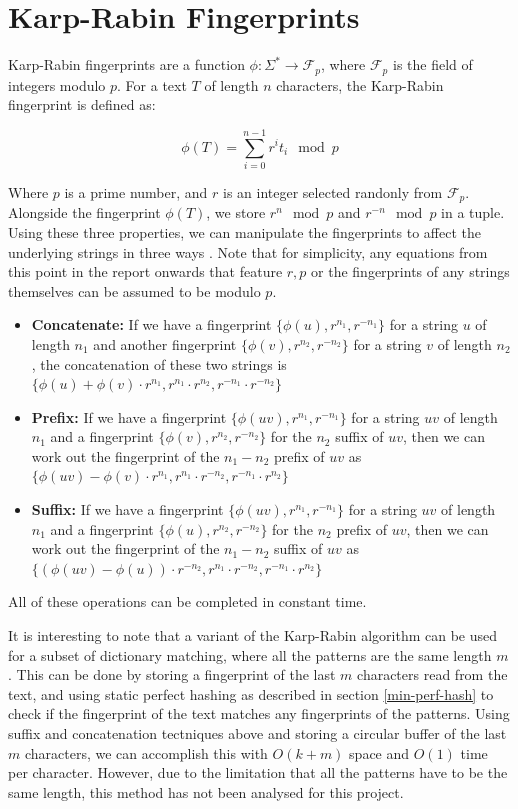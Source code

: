 \documentclass[ %
                    author={Dominic Joseph Moylett},
                    degree={MEng},
                     title={Dictionary Matching with Fingerprints},
                  subtitle={An Empirical Analysis},
                      type={research},
                      year={2015} ]{dissertation}
\begin{document}
\section{Karp-Rabin Fingerprints}
\label{sec:kr-fingerprints}

Karp-Rabin fingerprints \cite{5390135} are a function $\phi : \Sigma^* \to \mathcal{F}_p$, where $\mathcal{F}_p$ is the field of integers modulo $p$. For a text $T$ of length $n$ characters, the Karp-Rabin fingerprint is defined as:

$$\phi(T) = \sum_{i = 0}^{n - 1} r^it_i \mod p$$

Where $p$ is a prime number, and $r$ is an integer selected randonly from $\mathcal{F}_p$. Alongside the fingerprint $\phi(T)$, we store $r^n \mod p$ and $r^{-n} \mod p$ in a tuple. Using these three properties, we can manipulate the fingerprints to affect the underlying strings in three ways \cite{5438620}. Note that for simplicity, any equations from this point in the report onwards that feature $r, p$ or the fingerprints of any strings themselves can be assumed to be modulo $p$.

\begin{itemize}
  \item \textbf{Concatenate:} If we have a fingerprint $\{\phi(u), r^{n_1}, r^{-n_1}\}$ for a string $u$ of length $n_1$ and another fingerprint $\{\phi(v), r^{n_2}, r^{-n_2}\}$ for a string $v$ of length $n_2$, the concatenation of these two strings is $\{\phi(u) + \phi(v)\cdot r^{n_1}, r^{n_1} \cdot r^{n_2}, r^{-n_1} \cdot r^{-n_2}\}$
  \item \textbf{Prefix:} If we have a fingerprint $\{\phi(uv), r^{n_1}, r^{-n_1}\}$ for a string $uv$ of length $n_1$ and a fingerprint $\{\phi(v), r^{n_2}, r^{-n_2}\}$ for the $n_2$ suffix of $uv$, then we can work out the fingerprint of the $n_1 - n_2$ prefix of $uv$ as $\{\phi(uv) - \phi(v)\cdot r^{n_1}, r^{n_1} \cdot r^{-n_2}, r^{-n_1} \cdot r^{n_2}\}$
  \item \textbf{Suffix:} If we have a fingerprint $\{\phi(uv), r^{n_1}, r^{-n_1}\}$ for a string $uv$ of length $n_1$ and a fingerprint $\{\phi(u), r^{n_2}, r^{-n_2}\}$ for the $n_2$ prefix of $uv$, then we can work out the fingerprint of the $n_1 - n_2$ suffix of $uv$ as $\{(\phi(uv) - \phi(u))\cdot r^{-n_2}, r^{n_1} \cdot r^{-n_2}, r^{-n_1} \cdot r^{n_2}\}$
\end{itemize}

All of these operations can be completed in constant time.

It is interesting to note that a variant of the Karp-Rabin algorithm can be used for a subset of dictionary matching, where all the patterns are the same length $m$ \cite{candan:data}. This can be done by storing a fingerprint of the last $m$ characters read from the text, and using static perfect hashing as described in section \ref{min-perf-hash} to check if the fingerprint of the text matches any fingerprints of the patterns. Using suffix and concatenation tectniques above and storing a circular buffer of the last $m$ characters, we can accomplish this with $O(k + m)$ space and $O(1)$ time per character. However, due to the limitation that all the patterns have to be the same length, this method has not been analysed for this project.
\end{document}
